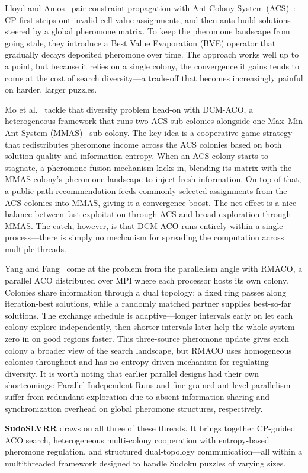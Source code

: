 Lloyd and Amos~\cite{lloyd2020} pair constraint propagation with Ant Colony System (ACS)~\cite{dorigo2004ant}: CP first strips out invalid cell-value assignments, and then ants build solutions steered by a global pheromone matrix. To keep the pheromone landscape from going stale, they introduce a Best Value Evaporation (BVE) operator that gradually decays deposited pheromone over time. The approach works well up to a point, but because it relies on a single colony, the convergence it gains tends to come at the cost of search diversity---a trade-off that becomes increasingly painful on harder, larger puzzles.

Mo et al.~\cite{mo2022} tackle that diversity problem head-on with DCM-ACO, a heterogeneous framework that runs two ACS sub-colonies alongside one Max--Min Ant System (MMAS)~\cite{dorigo2004ant} sub-colony. The key idea is a cooperative game strategy that redistributes pheromone income across the ACS colonies based on both solution quality and information entropy. When an ACS colony starts to stagnate, a pheromone fusion mechanism kicks in, blending its matrix with the MMAS colony's pheromone landscape to inject fresh information. On top of that, a public path recommendation feeds commonly selected assignments from the ACS colonies into MMAS, giving it a convergence boost. The net effect is a nice balance between fast exploitation through ACS and broad exploration through MMAS. The catch, however, is that DCM-ACO runs entirely within a single process---there is simply no mechanism for spreading the computation across multiple threads.

Yang and Fang~\cite{yang2015} come at the problem from the parallelism angle with RMACO, a parallel ACO distributed over MPI where each processor hosts its own colony. Colonies share information through a dual topology: a fixed ring passes along iteration-best solutions, while a randomly matched partner supplies best-so-far solutions. The exchange schedule is adaptive---longer intervals early on let each colony explore independently, then shorter intervals later help the whole system zero in on good regions faster. This three-source pheromone update gives each colony a broader view of the search landscape, but RMACO uses homogeneous colonies throughout and has no entropy-driven mechanism for regulating diversity. It is worth noting that earlier parallel designs had their own shortcomings: Parallel Independent Runs and fine-grained ant-level parallelism~\cite{randall2002} suffer from redundant exploration due to absent information sharing and synchronization overhead on global pheromone structures, respectively.

\textbf{SudoSLVRR} draws on all three of these threads. It brings together CP-guided ACO search, heterogeneous multi-colony cooperation with entropy-based pheromone regulation, and structured dual-topology communication---all within a multithreaded framework designed to handle Sudoku puzzles of varying sizes.